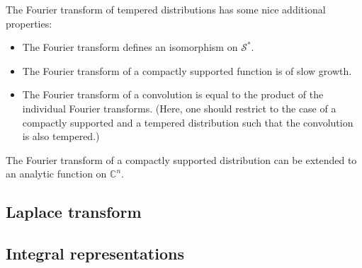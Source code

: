     \begin{property}
        The Fourier transform of tempered distributions has some nice additional properties:
        \begin{itemize}
            \item The Fourier transform defines an isomorphism on $\mathscr{S}^*$.
            \item The Fourier transform of a compactly supported function is of slow growth.
            \item The Fourier transform of a convolution is equal to the product of the individual Fourier transforms. (Here, one should restrict to the case of a compactly supported and a tempered distribution such that the convolution is also tempered.)
        \end{itemize}
    \end{property}

    \begin{theorem}
        The Fourier transform of a compactly supported distribution can be extended to an analytic function on $\mathbb{C}^n$.
    \end{theorem}

\subsection{Laplace transform}



\subsection{Integral representations}


